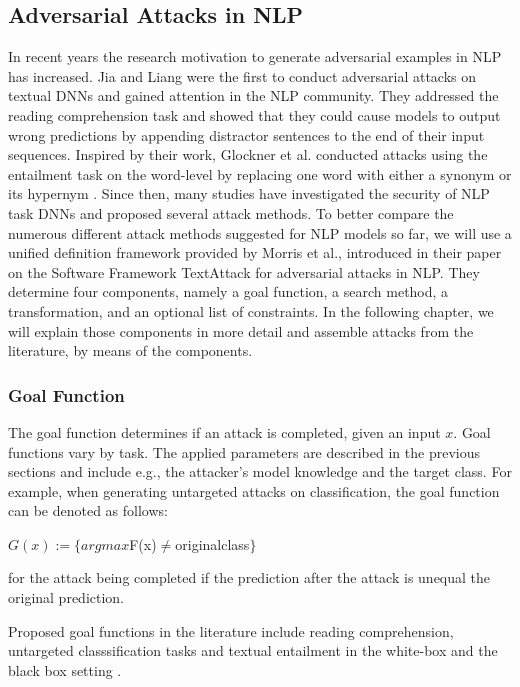 \subsection{Adversarial Attacks in NLP}
\label{sec:adv-ex_in_NLP}

In recent years the research motivation to generate adversarial examples in NLP has increased. Jia and Liang were the first to conduct adversarial attacks on textual DNNs and gained attention in the NLP community\cite{Jia2017AdversarialEF}. They addressed the reading comprehension task and showed that they could cause models to output wrong predictions by appending distractor sentences to the end of their input sequences. Inspired by their work, Glockner et al. conducted attacks using the entailment task on the word-level by replacing one word with either a synonym or its hypernym \cite{glockner2018breaking}. Since then, many studies have investigated the security of NLP task DNNs and proposed several attack methods. 
To better compare the numerous different attack methods suggested for NLP models so far, we will use a unified definition framework provided by Morris et al., introduced in their paper on the Software Framework TextAttack for adversarial attacks in NLP\cite{morris2020textattack}. They determine four components, namely a goal function, a search method, a transformation, and an optional list of constraints. In the following chapter, we will explain those components in more detail and assemble attacks from the literature, by means of the components.


\subsubsection{Goal Function}
\label{sec:goal_funciton}
The goal function determines if an attack is completed, given an input $x$. 
Goal functions vary by task. The applied parameters are described in the previous sections and include e.g., the attacker's model knowledge and the target class.
For example, when generating untargeted attacks on classification, the goal function can be denoted as follows:

$G(x):= \{argmax$F(x)$ \neq $original\textunderscore class$\}$

for the attack being completed if the prediction after the attack is unequal the original prediction. 

Proposed goal functions in the literature include reading comprehension, untargeted classsification tasks \cite{ebrahimi2017hotflip, alzantot2018generating, li2018textbugger, jin2019bert, garg2020bae} and textual entailment \cite{jin2019bert, alzantot2018generating} in the white-box \cite{papernot2016crafting, liang2017deep, ebrahimi2017hotflip, jin2019bert} and the black box setting \cite{gao2018black, goodman2020fastwordbug}.

